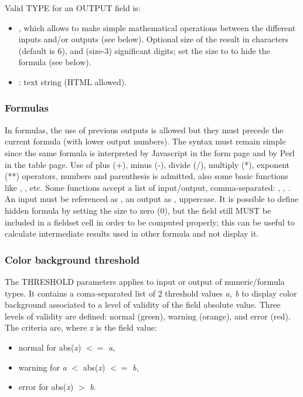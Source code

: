 Valid TYPE for an OUTPUT field is:
\begin{itemize}
	\item {}, which allows to make simple mathematical operations between the different inputs and/or outputs (see below). Optional size of the result in characters (default is 6), and (size-3) significant digits; set the size to  to hide the formula (see below).
	\item {} : text string (HTML allowed).
\end{itemize}

\subsubsection{Formulas}

In formulas, the use of previous outputs is allowed but they must precede the current formula (with lower output numbers). The syntax must remain simple since the same formula is interpreted by Javascript in the form page and by Perl in the table page. Use of plus (+), minus (-), divide (/), multiply (*), exponent (**) operators, numbers and parenthesis is admitted, also some basic functions like , , etc. Some functions accept a list of input/output, comma-separated: , , . An input must be referenced as , an output as , uppercase. It is possible to define hidden formula by setting the size to zero (0), but the field still MUST be included in a fieldset cell in order to be computed properly; this can be useful to calculate intermediate results used in other formula and not display it.
 
\subsubsection{Color background threshold}

The THRESHOLD parameters applies to input or output of numeric/formula types. It contains a coma-separated list of 2 threshold values {\it a, b} to display color background associated to a level of validity of the field absolute value. Three levels of validity are defined: normal (green), warning (orange), and error (red). The criteria are, where {\it x} is the field value:
\begin{itemize}
	\item normal for abs({\it x}) $<=$ {\it a},
	\item warning for {\it a} $<$ abs({\it x}) $<=$ {\it b},
	\item error for abs({\it x}) $>$ {\it b}.
\end{itemize}

